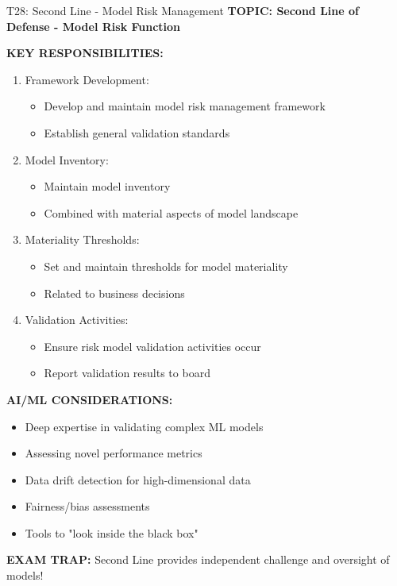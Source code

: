 \documentclass[8pt]{beamer}
\begin{document}
	\begin{frame}{T28: Second Line - Model Risk Management}
		\fontsize{6.5}{7.5}\selectfont
		\textbf{TOPIC: Second Line of Defense - Model Risk Function}
		
		\vspace{0.1cm}
		\textbf{KEY RESPONSIBILITIES:}
		\begin{enumerate}
			\item \textcolor{myblue}{Framework Development:}
			\begin{itemize}
				\item Develop and maintain model risk management framework
				\item Establish general validation standards
			\end{itemize}
			\item \textcolor{myblue}{Model Inventory:}
			\begin{itemize}
				\item Maintain model inventory
				\item Combined with material aspects of model landscape
			\end{itemize}
			\item \textcolor{myblue}{Materiality Thresholds:}
			\begin{itemize}
				\item Set and maintain thresholds for model materiality
				\item Related to business decisions
			\end{itemize}
			\item \textcolor{myblue}{Validation Activities:}
			\begin{itemize}
				\item Ensure risk model validation activities occur
				\item Report validation results to board
			\end{itemize}
		\end{enumerate}
		
		\vspace{0.1cm}
		\textbf{AI/ML CONSIDERATIONS:}
		\begin{itemize}
			\item Deep expertise in validating complex ML models
			\item Assessing novel performance metrics
			\item Data drift detection for high-dimensional data
			\item Fairness/bias assessments
			\item Tools to "look inside the black box"
		\end{itemize}
		
		\textcolor{myred}{\textbf{EXAM TRAP:}} Second Line provides \textcolor{myblue}{independent challenge and oversight} of models!
	\end{frame}
	
\end{document}
